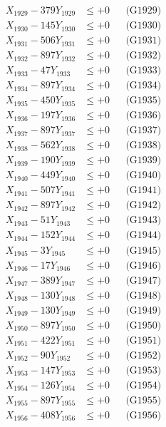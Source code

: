 \documentclass[a4paper,10pt]{article}
\begin{document}
{\begin{align}
X_{1929} - 379Y_{1929} &\leq +0 && \text{(G1929)} \\
X_{1930} - 145Y_{1930} &\leq +0 && \text{(G1930)} \\
\allowbreak
X_{1931} - 506Y_{1931} &\leq +0 && \text{(G1931)} \\
X_{1932} - 897Y_{1932} &\leq +0 && \text{(G1932)} \\
X_{1933} - 47Y_{1933} &\leq +0 && \text{(G1933)} \\
X_{1934} - 897Y_{1934} &\leq +0 && \text{(G1934)} \\
X_{1935} - 450Y_{1935} &\leq +0 && \text{(G1935)} \\
X_{1936} - 197Y_{1936} &\leq +0 && \text{(G1936)} \\
X_{1937} - 897Y_{1937} &\leq +0 && \text{(G1937)} \\
X_{1938} - 562Y_{1938} &\leq +0 && \text{(G1938)} \\
X_{1939} - 190Y_{1939} &\leq +0 && \text{(G1939)} \\
X_{1940} - 449Y_{1940} &\leq +0 && \text{(G1940)} \\
\allowbreak
X_{1941} - 507Y_{1941} &\leq +0 && \text{(G1941)} \\
X_{1942} - 897Y_{1942} &\leq +0 && \text{(G1942)} \\
X_{1943} - 51Y_{1943} &\leq +0 && \text{(G1943)} \\
X_{1944} - 152Y_{1944} &\leq +0 && \text{(G1944)} \\
X_{1945} - 3Y_{1945} &\leq +0 && \text{(G1945)} \\
X_{1946} - 17Y_{1946} &\leq +0 && \text{(G1946)} \\
X_{1947} - 389Y_{1947} &\leq +0 && \text{(G1947)} \\
X_{1948} - 130Y_{1948} &\leq +0 && \text{(G1948)} \\
X_{1949} - 130Y_{1949} &\leq +0 && \text{(G1949)} \\
X_{1950} - 897Y_{1950} &\leq +0 && \text{(G1950)} \\
\allowbreak
X_{1951} - 422Y_{1951} &\leq +0 && \text{(G1951)} \\
X_{1952} - 90Y_{1952} &\leq +0 && \text{(G1952)} \\
X_{1953} - 147Y_{1953} &\leq +0 && \text{(G1953)} \\
X_{1954} - 126Y_{1954} &\leq +0 && \text{(G1954)} \\
X_{1955} - 897Y_{1955} &\leq +0 && \text{(G1955)} \\
X_{1956} - 408Y_{1956} &\leq +0 && \text{(G1956)} \\

\end{align}}
\end{document}
